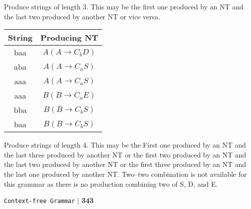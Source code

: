 \documentclass[a4]{article}
\begin{document}
\hspace*{0.4cm} Produce strings of length 3. This may be the first one produced by an NT and the last two produced
by another NT or vice versa.\\

\vspace*{0.1cm}

\begin{center}
\begin{tabular}{cc}
\hline

\hline

\hline

\hline
String & Producing NT \\
\hline
baa & $A (A \rightarrow C_{b}D)$ \\
aba & $A (A \rightarrow C_{a}S)$ \\
aaa & $A (A \rightarrow C_{a}S)$ \\
aaa & $B (B \rightarrow C_{a}E)$ \\
bba & $B (B \rightarrow C_{b}S)$ \\
baa & $B (B \rightarrow C_{b}S)$ \\
\hline

\hline

\hline

\hline

\end{tabular}
\end{center}

\vspace*{0.1cm}
\hspace*{0.5cm} Produce strings of length 4. This may be the First one produced by an NT and the last three produced
by another NT or the first two produced by an NT and the last two produced by another NT or the first
three produced by an NT and the last one produced by another NT. Two–two combination is not available
for this grammar as there is no production combining two of S, D, and E.\\

\newpage
\begin{flushright}
\texttt{Context-free Grammar} \hspace*{0.1cm}\textbf{$|$} \hspace*{0.1cm} \textbf{343}\hspace*{0.1cm}
\end{flushright}
\vspace*{0.1cm}
\end{document}
